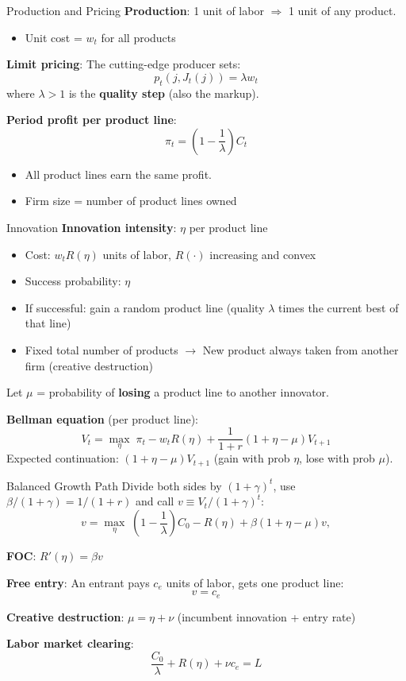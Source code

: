 \documentclass[blue]{beamer}
\begin{document}
\begin{frame}{Production and Pricing}
	\textbf{Production}: 1 unit of labor $\Rightarrow$ 1 unit of any product.
	\begin{itemize}
		\item Unit cost = $w_t$ for all products
	\end{itemize}
	
	\bigskip
	\textbf{Limit pricing}: The cutting-edge producer sets:
	\[
	p_t(j, J_t(j)) = \lambda w_t
	\]
	where $\lambda > 1$ is the \textbf{quality step} (also the markup).
	
	\bigskip
	\textbf{Period profit per product line}:
	\[
	\pi_t = \left(1 - \frac{1}{\lambda}\right) C_t
	\]
	\begin{itemize}
		\item All product lines earn the same profit.
		\item Firm size = number of product lines owned
	\end{itemize}
\end{frame}

\begin{frame}{Innovation}
	\textbf{Innovation intensity}: $\eta$ per product line
	\begin{itemize}
		\item Cost: $w_t R(\eta)$ units of labor, $R(\cdot)$ increasing and convex
		\item Success probability: $\eta$
		\item If successful: gain a random product line (quality $\lambda$ times the current best of that line)
		\item Fixed total number of products $\rightarrow$ New product always taken from another firm (creative destruction)
	\end{itemize}
	
	\medskip
	Let $\mu$ = probability of \textbf{losing} a product line to another innovator.
	
	\medskip
	\textbf{Bellman equation} (per product line):
	\[
	V_t = \max_\eta \; \pi_t - w_t R(\eta) + \frac{1}{1+r}(1 + \eta - \mu) V_{t+1}
	\]
	Expected continuation: $(1+\eta - \mu)V_{t+1}$ (gain with prob $\eta$, lose with prob $\mu$).
\end{frame}

\begin{frame}{Balanced Growth Path}
	Divide both sides by $(1+\gamma)^t$, use $\beta/(1+\gamma) = 1/(1+r)$ and call $v\equiv V_t/(1+\gamma)^t$:
	\[
	v = \max_\eta \; \left(1 - \frac{1}{\lambda}\right) C_0 - R(\eta) + \beta(1 + \eta - \mu) v,
	\]
	
	\textbf{FOC}: $R'(\eta) = \beta v$
	
	\medskip
	\textbf{Free entry}: An entrant pays $c_e$ units of labor, gets one product line:
	\[
	v = c_e
	\]
	
	\textbf{Creative destruction}: $\mu = \eta + \nu$ \quad (incumbent innovation + entry rate)
	
	\medskip
	\textbf{Labor market clearing}:
	\[
	\frac{C_0}{\lambda} + R(\eta) + \nu c_e = L
	\]
\end{frame}
\end{document}
